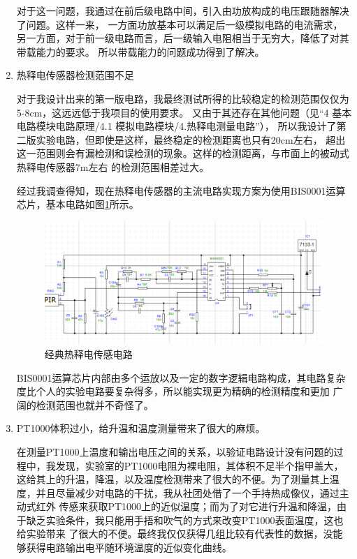 \documentclass{article}
\begin{document}
\begin{spacing}{1.5}
\begin{enumerate}
    对于这一问题，我通过在前后级电路中间，引入由功放构成的电压跟随器解决了问题。这样一来，
    一方面功放基本可以满足后一级模拟电路的电流需求，
    另一方面，对于前一级电路而言，后一级输入电阻相当于无穷大，降低了对其带载能力的要求。
    所以带载能力的问题成功得到了解决。

    \item 热释电传感器检测范围不足
    
    对于我设计出来的第一版电路，我最终测试所得的比较稳定的检测范围仅仅为5-8cm，这远远低于我项目的使用要求。
    又由于其还存在其他问题（见“4 基本电路模块电路原理/4.1 模拟电路模块/4.热释电测量电路”），
    所以我设计了第二版实验电路，但即使是这样，最终稳定的检测距离也只有20cm左右，
    超出这一范围则会有漏检测和误检测的现象。这样的检测距离，与市面上的被动式热释电传感器7m左右
    的检测范围相差过大。

    经过我调查得知，现在热释电传感器的主流电路实现方案为使用BIS0001运算芯片，基本电路如图\ref{fig:review1}所示。
    
    \begin{figure}[H]
        \centering
        \includegraphics[scale=0.4]{fig/review/1.png}
        \caption{经典热释电传感电路}
        \label{fig:review1}
    \end{figure}

    BIS0001运算芯片内部由多个运放以及一定的数字逻辑电路构成，其电路复杂度比个人的实验电路要复杂得多，所以能实现更为精确的检测精度和更加
    广阔的检测范围也就并不奇怪了。
    
    \item PT1000体积过小，给升温和温度测量带来了很大的麻烦。
    
    在测量PT1000上温度和输出电压之间的关系，以验证电路设计没有问题的过程中，我发现，实验室的PT1000电阻为裸电阻，其体积不足半个指甲盖大，
    这给其上的升温，降温，以及温度检测带来了很大的不便。为了测量其上温度，并且尽量减少对电路的干扰，我从社团处借了一个手持热成像仪，通过主动式红外
    传感来获取PT1000上的近似温度；而为了对它进行升温和降温，由于缺乏实验条件，我只能用手捂和吹气的方式来改变PT1000表面温度，这也给实验带来
    了很大的不便。最终我仅仅获得几组比较有代表性的数据，没能够获得电路输出电平随环境温度的近似变化曲线。


\end{enumerate}
\end{spacing}
\end{document}

